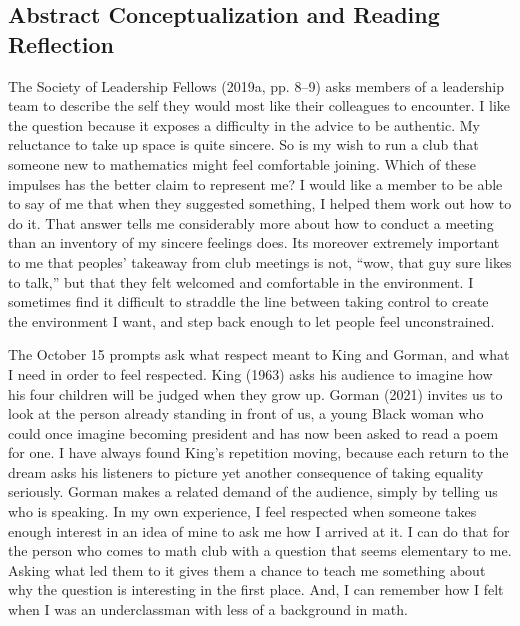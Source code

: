 \documentclass[12pt,letterpaper]{article}
\begin{document}
\subsection{Abstract Conceptualization and Reading Reflection}
The Society of Leadership Fellows (2019a, pp. 8--9) asks members of a leadership team to describe the self they would most like their colleagues to encounter. I like the question because it exposes a difficulty in the advice to be authentic. My reluctance to take up space is quite sincere. So is my wish to run a club that someone new to mathematics might feel comfortable joining. Which of these impulses has the better claim to represent me? I would like a member to be able to say of me that when they suggested something, I helped them work out how to do it. That answer tells me considerably more about how to conduct a meeting than an inventory of my sincere feelings does.
Its moreover extremely important to me that peoples' takeaway from club meetings is not, ``wow, that guy sure likes to talk,'' but that they felt welcomed and comfortable in the environment.
I sometimes find it difficult to straddle the line between taking control to create the environment I want, and step back enough to let people feel unconstrained.

The October 15 prompts ask what respect meant to King and Gorman, and what I need in order to feel respected. King (1963) asks his audience to imagine how his four children will be judged when they grow up. Gorman (2021) invites us to look at the person already standing in front of us, a young Black woman who could once imagine becoming president and has now been asked to read a poem for one. I have always found King's repetition moving, because each return to the dream asks his listeners to picture yet another consequence of taking equality seriously. Gorman makes a related demand of the audience, simply by telling us who is speaking.
In my own experience, I feel respected when someone takes enough interest in an idea of mine to ask me how I arrived at it. I can do that for the person who comes to math club with a question that seems elementary to me. Asking what led them to it gives them a chance to teach me something about why the question is interesting in the first place.
And, I can remember how I felt when I was an underclassman with less of a background in math.
\end{document}
